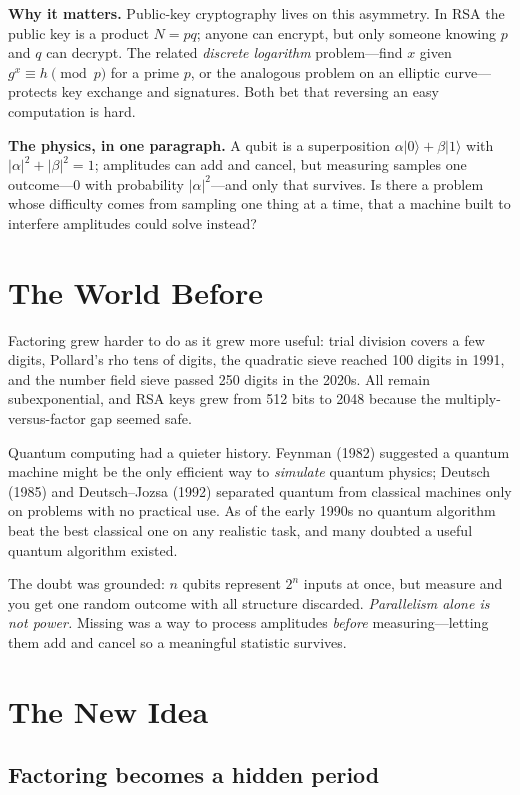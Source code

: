 \noindent\textbf{Why it matters.} Public-key cryptography lives on this asymmetry. In RSA the public key is a product $N=pq$; anyone can encrypt, but only someone knowing $p$ and $q$ can decrypt. The related \emph{discrete logarithm} problem---find $x$ given $g^x\equiv h\pmod p$ for a prime $p$, or the analogous problem on an elliptic curve---protects key exchange and signatures. Both bet that reversing an easy computation is hard.

\noindent\textbf{The physics, in one paragraph.} A qubit is a superposition $\alpha\lvert 0\rangle+\beta\lvert 1\rangle$ with $|\alpha|^2+|\beta|^2=1$; amplitudes can add and cancel, but measuring samples one outcome---0 with probability $|\alpha|^2$---and only that survives. Is there a problem whose difficulty comes from sampling one thing at a time, that a machine built to interfere amplitudes could solve instead?

\section{The World Before}

Factoring grew harder to do as it grew more useful: trial division covers a few digits, Pollard's rho tens of digits, the quadratic sieve reached 100 digits in 1991, and the number field sieve passed 250 digits in the 2020s. All remain subexponential, and RSA keys grew from 512 bits to 2048 because the multiply-versus-factor gap seemed safe.

Quantum computing had a quieter history. Feynman (1982) suggested a quantum machine might be the only efficient way to \emph{simulate} quantum physics; Deutsch (1985) and Deutsch--Jozsa (1992) separated quantum from classical machines only on problems with no practical use. As of the early 1990s no quantum algorithm beat the best classical one on any realistic task, and many doubted a useful quantum algorithm existed.

The doubt was grounded: $n$ qubits represent $2^n$ inputs at once, but measure and you get one random outcome with all structure discarded. \emph{Parallelism alone is not power.} Missing was a way to process amplitudes \emph{before} measuring---letting them add and cancel so a meaningful statistic survives.

\section{The New Idea}

\subsection{Factoring becomes a hidden period}

